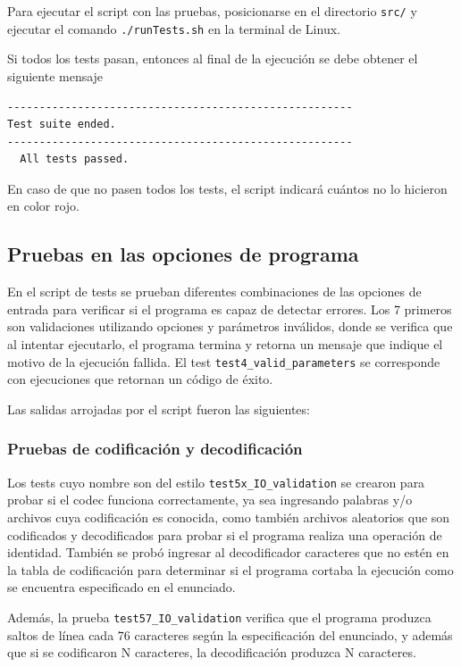 Para ejecutar el script con las pruebas, posicionarse en el directorio \texttt{src/} y ejecutar el comando \texttt{./runTests.sh} en la terminal de Linux.

Si todos los tests pasan, entonces al final de la ejecución se debe obtener el siguiente mensaje
\begin{lstlisting}[language=bash, style=StyleC]
------------------------------------------------------
Test suite ended.
------------------------------------------------------
  All tests passed.
\end{lstlisting}
En caso de que no pasen todos los tests, el script indicará cuántos no lo hicieron en color rojo.

\subsection{Pruebas en las opciones de programa}

En el script de tests se prueban diferentes combinaciones de las opciones de entrada para verificar si el programa es capaz de detectar errores. Los 7 primeros son validaciones utilizando opciones y parámetros inválidos, donde se verifica que al intentar ejecutarlo, el programa termina y retorna un mensaje que indique el motivo de la ejecución fallida. El test \texttt{test4\_valid\_parameters} se corresponde con ejecuciones que retornan un código de éxito.

Las salidas arrojadas por el script fueron las siguientes:



\subsubsection{Pruebas de codificación y decodificación}

Los tests cuyo nombre son del estilo \texttt{test5x\_IO\_validation} se crearon para probar si el codec funciona correctamente, ya sea ingresando palabras y/o archivos cuya codificación es conocida, como también archivos aleatorios que son codificados y decodificados para probar si el programa realiza una operación de identidad. También se probó ingresar al decodificador caracteres que no estén en la tabla de codificación para determinar si el programa cortaba la ejecución como se encuentra especificado en el enunciado.

Además, la prueba \texttt{test57\_IO\_validation} verifica que el programa produzca saltos de línea cada 76 caracteres según la especificación del enunciado, y además que si se codificaron N caracteres, la decodificación produzca N caracteres.

